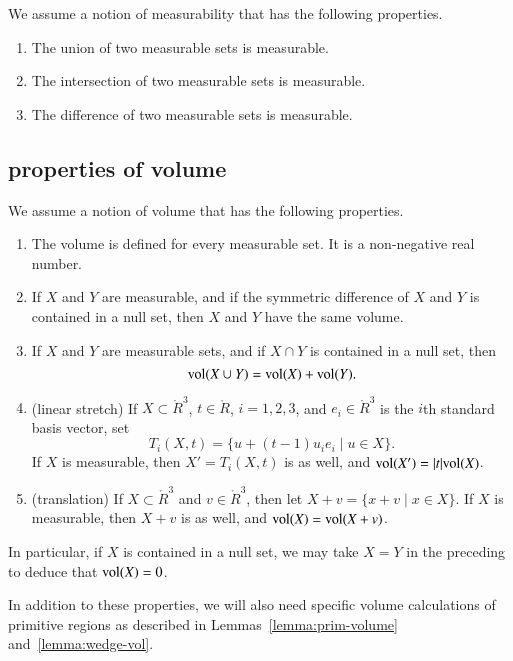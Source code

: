 We assume a notion of measurability that has the following properties.

\begin{enumerate}%
 \item The union of two measurable sets is measurable.\\
 \item The intersection of two measurable sets is measurable.\\
 \item The difference of two measurable sets is measurable.
\end{enumerate}

\subsection{properties of volume}

We assume a notion of volume that has the following properties.

\begin{enumerate}%
 \item The volume is defined for every measurable set.  It is
    a non-negative real number.
 \item If $X$ and $Y$ are  measurable, and if
 the symmetric difference of
 $X$ and $Y$ is contained in a null set, then 
    $X$ and $Y$ have the same volume.\\
 \item If $X$ and $Y$ are measurable sets, and if $X\cap
 Y$ is contained in a null set, then
    $$
    {\operatorname{vol}}(X\cup Y) = {\operatorname{vol}}(X) + {\operatorname{vol}}(Y).
    $$
  \item (linear stretch) If $X\subset \ring{R}^3$, $t\in\ring{R}$, 
    $i=1,2,3$, and $e_i\in\ring{R}^3$ is the $i$th standard basis vector,
    set 
      $$T_i(X,t) = \{ u + (t-1) u_i e_i \mid u\in X\}.
      $$
    If $X$ is measurable, then $X'=T_i(X,t)$ is as well,
    and ${\operatorname{vol}}(X') = |t|{\operatorname{vol}}(X)$.
  \item (translation) If $X\subset \ring{R}^3$ and $v\in\ring{R}^3$, then let
    $X+v = \{x + v\mid x\in X\}$.  If $X$ is measurable, then $X+v$ is
    as well, and ${\operatorname{vol}}(X) = {\operatorname{vol}}(X+v)$.
\end{enumerate}

In particular, if $X$ is contained in a null set, we may take
$X=Y$ in the preceding to deduce that ${\operatorname{vol}}(X)=0$.

In addition to these properties, we will also need specific
volume calculations of primitive regions as described in
Lemmas~\ref{lemma:prim-volume} and~\ref{lemma:wedge-vol}.

